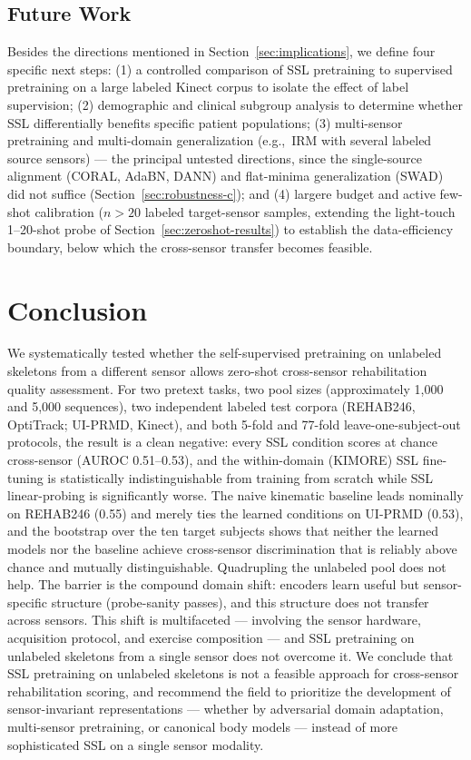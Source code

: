 \documentclass[10pt,journal]{IEEEtran}
\begin{document}
\subsection{Future Work}
\label{sec:future}

Besides the directions mentioned in Section~\ref{sec:implications}, we define four specific next steps: (1) a controlled comparison of SSL pretraining to supervised pretraining on a large labeled Kinect corpus to isolate the effect of label supervision; (2) demographic and clinical subgroup analysis to determine whether SSL differentially benefits specific patient populations; (3) multi-sensor pretraining and multi-domain generalization (e.g.,\ IRM \cite{arjovsky2019irm} with several labeled source sensors) --- the principal untested directions, since the single-source alignment (CORAL, AdaBN, DANN) and flat-minima generalization (SWAD) did not suffice (Section~\ref{sec:robustness-c}); and (4) largere budget and active few-shot calibration ($n > 20$ labeled target-sensor samples, extending the light-touch 1--20-shot probe of Section~\ref{sec:zeroshot-results}) to establish the data-efficiency boundary, below which the cross-sensor transfer becomes feasible.

\section{Conclusion}
\label{sec:conclusion}

We systematically tested whether the self-supervised pretraining on unlabeled skeletons from a different sensor allows zero-shot cross-sensor rehabilitation quality assessment. For two pretext tasks, two pool sizes (approximately 1,000 and 5,000 sequences), two independent labeled test corpora (REHAB246, OptiTrack; UI-PRMD, Kinect), and both 5-fold and 77-fold leave-one-subject-out protocols, the result is a clean negative: every SSL condition scores at chance cross-sensor (AUROC 0.51--0.53), and the within-domain (KIMORE) SSL fine-tuning is statistically indistinguishable from training from scratch while SSL linear-probing is significantly worse. The naive kinematic baseline leads nominally on REHAB246 (0.55) and merely ties the learned conditions on UI-PRMD (0.53), and the bootstrap over the ten target subjects shows that neither the learned models nor the baseline achieve cross-sensor discrimination that is reliably above chance and mutually distinguishable. Quadrupling the unlabeled pool does not help. The barrier is the compound domain shift: encoders learn useful but sensor-specific structure (probe-sanity passes), and this structure does not transfer across sensors. This shift is multifaceted --- involving the sensor hardware, acquisition protocol, and exercise composition --- and SSL pretraining on unlabeled skeletons from a single sensor does not overcome it. We conclude that SSL pretraining on unlabeled skeletons is not a feasible approach for cross-sensor rehabilitation scoring, and recommend the field to prioritize the development of sensor-invariant representations --- whether by adversarial domain adaptation, multi-sensor pretraining, or canonical body models --- instead of more sophisticated SSL on a single sensor modality.
\end{document}
